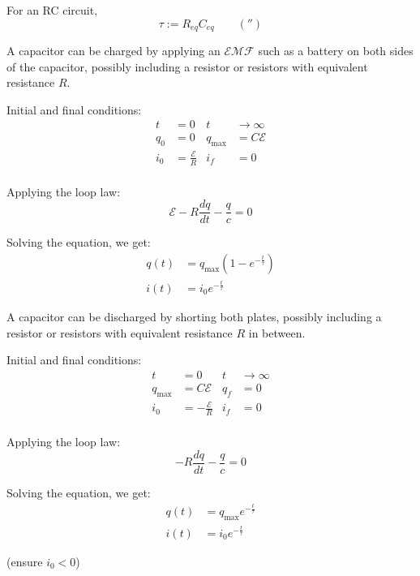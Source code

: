 \begin{definition}
  For an RC circuit,
  \[
    \tau := R_{eq} C_{eq} \qquad (\second)
  \]
\end{definition}

\begin{law}
  A capacitor can be charged by applying an $\mathcal{EMF}$ such as a battery on both sides of the capacitor, possibly including a resistor or resistors with equivalent resistance $R$.

  Initial and final conditions:
  \begin{align*}
    t &= 0 & t &\to \infty \\
    q_0 &= 0 & q_{\text{max}} &= C\mathcal{E} \\
    i_0 &= \frac{\mathcal{E}}{R} & i_f &= 0 \\
  \end{align*}

  Applying the loop law:
  \[
    \mathcal{E} - R \frac{dq}{dt} - \frac{q}{c} = 0
  \]

  Solving the equation, we get:
  \begin{align*}
    q(t) &= q_{\text{max}} \left(1 - e^{- \frac{t}{\tau}}\right) \\
    i(t) &= i_0 e^{- \frac{t}{\tau}}
  \end{align*}
\end{law}

\begin{law}
  A capacitor can be discharged by shorting both plates, possibly including a resistor or resistors with equivalent resistance $R$ in between.

  Initial and final conditions:
  \begin{align*}
    t &= 0 & t &\to \infty \\
    q_{\text{max}} &= C\mathcal{E} & q_f &= 0 \\
    i_0 &= -\frac{\mathcal{E}}{R} & i_f &= 0 \\
  \end{align*}

  Applying the loop law:
  \[
    - R \frac{dq}{dt} - \frac{q}{c} = 0
  \]

  Solving the equation, we get:
  \begin{align*}
    q(t) &= q_{\text{max}} e^{- \frac{t}{\tau}} \\
    i(t) &= i_0 e^{- \frac{t}{\tau}}
  \end{align*}

  (ensure $i_0 < 0$)
\end{law}

